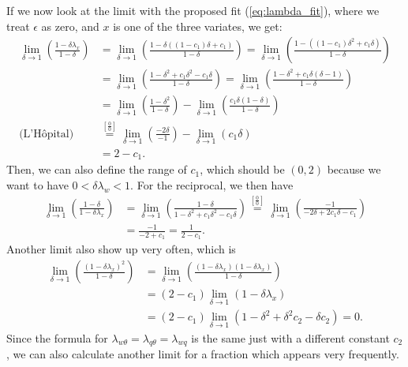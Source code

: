 If we now look at the limit with the proposed fit (\cref{eq:lambda_fit}),
where we treat $\epsilon$ as zero,
and $x$ is one of the three variates, we get:
\begin{align}
    \lim_{\delta \to 1} \left(\frac{1 - \delta\lambda_x}{1 - \delta}\right)
    &= \lim_{\delta \to 1} \left(\frac{1 - \delta((1 - c_1) \delta + c_1)}{1 - \delta}\right)
    = \lim_{\delta \to 1} \left(\frac{1 - ((1 - c_1) \delta^2 + c_1\delta)}{1 - \delta}\right) \\
    &= \lim_{\delta \to 1} \left(\frac{1 - \delta^2 + c_1\delta^2 - c_1\delta}{1 - \delta}\right)
    = \lim_{\delta \to 1} \left(\frac{1 - \delta^2 + c_1\delta(\delta - 1)}{1 - \delta}\right) \\
    &= \lim_{\delta \to 1} \left(\frac{1 - \delta^2}{1 - \delta}\right)
    - \lim_{\delta \to 1} \left(\frac{c_1\delta(1 - \delta)}{1 - \delta}\right) \\
    \text{(L'Hôpital)}
    &\overset{\left[\frac{0}{0}\right]}{=} \lim_{\delta \to 1} \left(\frac{-2\delta}{-1}\right)
    - \lim_{\delta \to 1} \left(c_1\delta\right) \\
    &= 2 - c_1.
\end{align}
Then, we can also define the range of $c_1$,
which should be $(0, 2)$ because we want to have $0 < \delta\lambda_w < 1$.
For the reciprocal, we then have
\begin{align}
    \lim_{\delta \to 1} \left(\frac{1 - \delta}{1 - \delta\lambda_x}\right)
    &= \lim_{\delta \to 1} \left(\frac{1 - \delta}{1 - \delta^2 + c_1\delta^2 - c_1\delta}\right)
    \overset{\left[\frac{0}{0}\right]}{=} \lim_{\delta \to 1} \left(\frac{-1}{- 2\delta + 2c_1\delta - c_1}\right) \\
    &= \frac{-1}{-2 + c_1} = \frac{1}{2 - c_1}.
\end{align}
Another limit also show up very often, which is
\begin{align}
    \lim_{\delta \to 1} \left(\frac{(1 - \delta\lambda_x)^2}{1 - \delta}\right)
    &= \lim_{\delta \to 1} \left(\frac{(1 - \delta\lambda_x) (1 - \delta\lambda_x)}{1 - \delta}\right) \\
    &= (2 - c_1) \lim_{\delta \to 1} (1 - \delta \lambda_x) \\
    &= (2 - c_1) \lim_{\delta \to 1} (1 - \delta^2 + \delta^2 c_2 - \delta c_2) = 0.
\end{align}
Since the formula for $\lambda_{w\theta} = \lambda_{q\theta} = \lambda_{wq}$ is the same just with a different constant $c_2$,
we can also calculate another limit for a fraction which appears very frequently.
